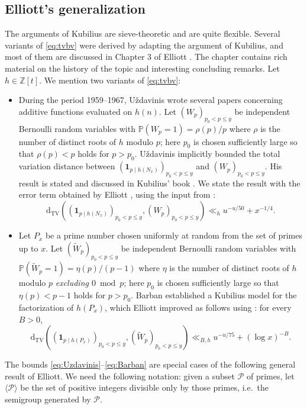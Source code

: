 \documentclass{article}
\theoremstyle{plain}
\theoremstyle{remark}
\newcommand{\PP}{\mathbb{P}}
\newcommand{\ZZ}{\mathbb{Z}}
\newcommand{\Pa}{\mathcal{P}}
\newcommand{\dtv}{\mathrm{d}_{\mathrm{TV}}}
\numberwithin{equation}{section}
\begin{document}
\subsection{Elliott's generalization}\label{sec:ellgen}
The arguments of Kubilius are sieve-theoretic and are quite flexible. Several variants of \eqref{eq:tvbv} were derived by adapting the argument of Kubilius, and most of them are discussed in Chapter 3 of Elliott \cite{Elliott1}. The chapter contains  rich material on the history of the topic and interesting concluding remarks. Let $h\in \ZZ[t]$. We mention two variants of \eqref{eq:tvbv}:
\begin{itemize}
	\item  During the period 1959--1967, U\v{z}davinis wrote several papers concerning additive functions evaluated on $h(n)$. Let  $(W_p)_{p_0<p\le y}$ be independent  Bernoulli random variables with $\PP(W_p=1)=\rho(p)/p$ where $\rho$ is the number of distinct roots of $h$ modulo $p$; here $p_0$ is chosen sufficiently large so that $\rho(p)<p$ holds for $p>p_0$. U\v{z}davinis \cite{Uzd} implicitly bounded the total variation distance between $(\mathbf{1}_{p\mid h(N_x)})_{p_0<p\le y}$ and $(W_p)_{p_0<p\le y}$. His result is stated and  discussed in Kubilius' book \cite[p.~28]{KubTranslate}. We state the result with the error term obtained by Elliott \cite[pp.~131--134]{Elliott1}, using the input from \cite{BV}:
	\begin{equation}\label{eq:Uzdavinis}
		\dtv( (\mathbf{1}_{p\mid h(N_x)})_{p_0<p\le y}, (W_p)_{p_0<p\le y})\ll_h  u^{-u/50}+x^{-1/4}.
	\end{equation}
	\item Let $P_{x}$ be a prime number chosen uniformly at random from the set of primes up to $x$. Let  $(\widetilde{W}_p)_{p_0<p\le y}$ be independent  Bernoulli random variables with $\PP(\widetilde{W}_p=1)=\eta(p)/(p-1)$ where $\eta$ is the number of distinct roots of $h$ modulo $p$  \textit{excluding $0\bmod p$}; here $p_0$ is chosen sufficiently large so that $\eta(p)<p-1$ holds for $p>p_0$. Barban \cite{Barban} established a Kubilius model for the factorization of $h(P_x)$, which Elliott \cite[pp.~134--136]{Elliott1} improved as follows using \cite{BV}: for every $B>0$,
	\begin{equation}\label{eq:Barban}
		\dtv( (\mathbf{1}_{p\mid h(P_x)})_{p_0<p\le y}, (\widetilde{W}_p)_{p_0<p\le y})\ll_{B,h} u^{-u/75}+(\log x)^{-B}.
	\end{equation}
\end{itemize}
The bounds \eqref{eq:Uzdavinis}--\eqref{eq:Barban} are special cases of the following general result of Elliott. We need the following notation: given a subset $\Pa$ of primes, let $\langle \Pa \rangle$ be the set of positive integers divisible only by those primes, i.e.~the semigroup generated by $\Pa$. 
\end{document}
